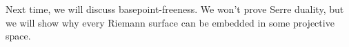 \documentclass[12pt]{memoir}
\begin{document}
Next time, we will discuss basepoint-freeness. We won't prove Serre duality, but we will show why every Riemann surface can be embedded in some projective space.

\ifx\nextra\undefined
\printindex
\else\fi
\nocite{*}


\end{document}
